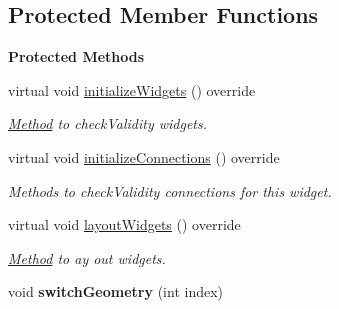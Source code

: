 \subsection*{Protected Member Functions}
\begin{Indent}\textbf{ Protected Methods}\par
\begin{DoxyCompactItemize}
\item 
\mbox{\label{classrev_1_1_view_1_1_physics_geometry_widget_af3d2de960dfe2e35e1269b8888a87963}} 
virtual void \mbox{\hyperlink{classrev_1_1_view_1_1_physics_geometry_widget_af3d2de960dfe2e35e1269b8888a87963}{initialize\+Widgets}} () override
\begin{DoxyCompactList}\small\item\em \mbox{\hyperlink{struct_method}{Method}} to check\+Validity widgets. \end{DoxyCompactList}\item 
\mbox{\label{classrev_1_1_view_1_1_physics_geometry_widget_a606e945bde3ce339a2c3d95d36b03c3d}} 
virtual void \mbox{\hyperlink{classrev_1_1_view_1_1_physics_geometry_widget_a606e945bde3ce339a2c3d95d36b03c3d}{initialize\+Connections}} () override
\begin{DoxyCompactList}\small\item\em Methods to check\+Validity connections for this widget. \end{DoxyCompactList}\item 
\mbox{\label{classrev_1_1_view_1_1_physics_geometry_widget_a30a890cf7900f59e15f04a5868d2c594}} 
virtual void \mbox{\hyperlink{classrev_1_1_view_1_1_physics_geometry_widget_a30a890cf7900f59e15f04a5868d2c594}{layout\+Widgets}} () override
\begin{DoxyCompactList}\small\item\em \mbox{\hyperlink{struct_method}{Method}} to ay out widgets. \end{DoxyCompactList}\item 
\mbox{\label{classrev_1_1_view_1_1_physics_geometry_widget_a38f7ec5fd57761ef2fc00341fd1dc577}} 
void {\bfseries switch\+Geometry} (int index)
\end{DoxyCompactItemize}
\end{Indent}
